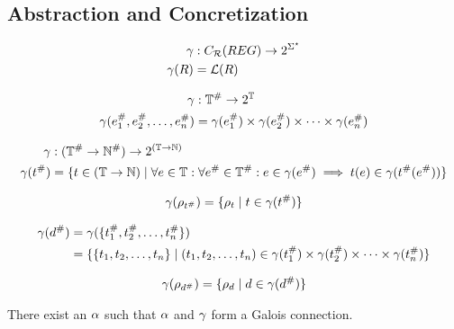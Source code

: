 \subsection{Abstraction and Concretization}\label{subsec:abstraction-and-concretization}

\begin{align}
    \gamma &: C_{\mathcal{R}}(REG) \rightarrow 2^{\Sigma^\star} \\
    \gamma(R) &= \mathcal{L}(R)
\end{align}

\begin{align}
    \gamma &: \mathbb{T}^\# \rightarrow 2^\mathbb{T} \\
    \gamma (e_1^\#, e_2^\#, \dots, e_n^\#) &= \gamma(e_1^\#) \times \gamma(e_2^\#) \times \dots \times \gamma(e_n^\#)
\end{align}

\begin{align}
    \gamma &: (\mathbb{T}^\# \rightarrow \mathbb{N}^\#) \rightarrow 2^{(\mathbb{T} \rightarrow \mathbb{N})} \\
    \gamma(t^\#) &= \{t \in (\mathbb{T} \rightarrow \mathbb{N}) \mid \forall e \in \mathbb{T} : \forall e^\# \in \mathbb{T}^\# : e \in \gamma(e^\#) \implies t(e) \in \gamma(t^\#(e^\#))\}
\end{align}

\begin{align}
    \gamma(\rho_{t^\#}) = \{ \rho_{t} \mid t \in \gamma(t^\#) \}
\end{align}

\begin{align}
    \gamma(d^\#) &= \gamma(\{t_1^\#, t_2^\#, \dots, t_n^\#\}) \\
                    &= \{ \{ t_1, t_2, \dots, t_n \} \mid (t_1, t_2, \dots, t_n) \in \gamma(t_1^\#) \times \gamma(t_2^\#) \times \dots \times \gamma(t_n^\#) \}
\end{align}

\begin{align}
    \gamma(\rho_{d^\#}) = \{ \rho_{d} \mid d \in \gamma(d^\#) \}
\end{align}

\begin{conjecture}
    There exist an $\alpha$ such that $\alpha$ and $\gamma$ form a Galois connection.
\end{conjecture}

